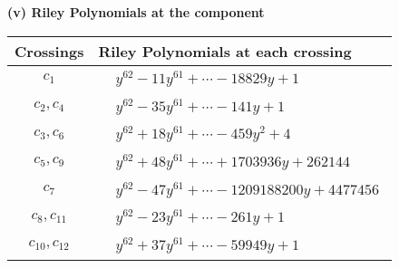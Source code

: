 \documentclass[1p]{elsarticle_modified}
\theoremstyle{definition}
\begin{document}
\flushleft \textbf{(v) Riley Polynomials at the component}\newline \\
\begin{tabular}{m{50pt}|m{274pt}}
Crossings & \hspace{64pt}Riley Polynomials at each crossing \\
\hline $$\begin{aligned}c_{1}\end{aligned}$$&$\begin{aligned}
&y^{62}-11 y^{61}+\cdots-18829 y+1
\end{aligned}$\\
\hline $$\begin{aligned}c_{2},c_{4}\end{aligned}$$&$\begin{aligned}
&y^{62}-35 y^{61}+\cdots-141 y+1
\end{aligned}$\\
\hline $$\begin{aligned}c_{3},c_{6}\end{aligned}$$&$\begin{aligned}
&y^{62}+18 y^{61}+\cdots-459 y^2+4
\end{aligned}$\\
\hline $$\begin{aligned}c_{5},c_{9}\end{aligned}$$&$\begin{aligned}
&y^{62}+48 y^{61}+\cdots+1703936 y+262144
\end{aligned}$\\
\hline $$\begin{aligned}c_{7}\end{aligned}$$&$\begin{aligned}
&y^{62}-47 y^{61}+\cdots-1209188200 y+4477456
\end{aligned}$\\
\hline $$\begin{aligned}c_{8},c_{11}\end{aligned}$$&$\begin{aligned}
&y^{62}-23 y^{61}+\cdots-261 y+1
\end{aligned}$\\
\hline $$\begin{aligned}c_{10},c_{12}\end{aligned}$$&$\begin{aligned}
&y^{62}+37 y^{61}+\cdots-59949 y+1
\end{aligned}$\\
\hline
\end{tabular}\\~\\
\end{document}
